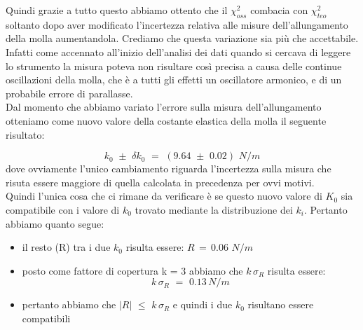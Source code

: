 Quindi grazie a tutto questo abbiamo ottento che il $\chi_{oss}^2$ combacia con $\chi_{teo}^2$ soltanto dopo aver modificato l'incertezza relativa alle misure dell'allungamento della molla aumentandola. Crediamo che questa variazione sia più che accettabile. Infatti come accennato all'inizio dell'analisi dei dati quando si cercava di leggere lo strumento la misura poteva non risultare così precisa a causa delle continue oscillazioni della molla, che è a tutti gli effetti un oscillatore armonico, e di un probabile errore di parallasse.\\
Dal momento che abbiamo variato l'errore sulla misura dell'allungamento otteniamo come nuovo valore della costante elastica della molla il seguente risultato:

\begin{equation*}
	k_0 \,\, \pm \,\, \delta k_0 \,\,=\,\, (9.64 \,\, \pm \,\, 0.02)\,\, N/m
\end{equation*}
%
dove ovviamente l'unico cambiamento riguarda l'incertezza sulla misura che risuta essere maggiore di quella calcolata in precedenza per ovvi motivi.\\

Quindi l'unica cosa che ci rimane da verificare è se questo nuovo valore di $K_0$ sia compatibile con i valore di $k_0$ trovato mediante la distribuzione dei $k_i$.
Pertanto abbiamo quanto segue:
\begin{itemize}
	\item{il resto (R) tra i due $k_0$ risulta essere: $R \,=\, 0.06 \,\, N/m$}
	\item{posto come fattore di copertura k = 3 abbiamo che $k \, \sigma_R$ risulta essere:
			\begin{equation*}
				k \, \sigma_R \,\,=\,\, 0.13 \, N/m
			\end{equation*}}
	\item{pertanto abbiamo che $|R| \,\, \leq \,\, k \, \sigma_R $ e quindi i due $k_0$ risultano essere compatibili}
\end{itemize}

